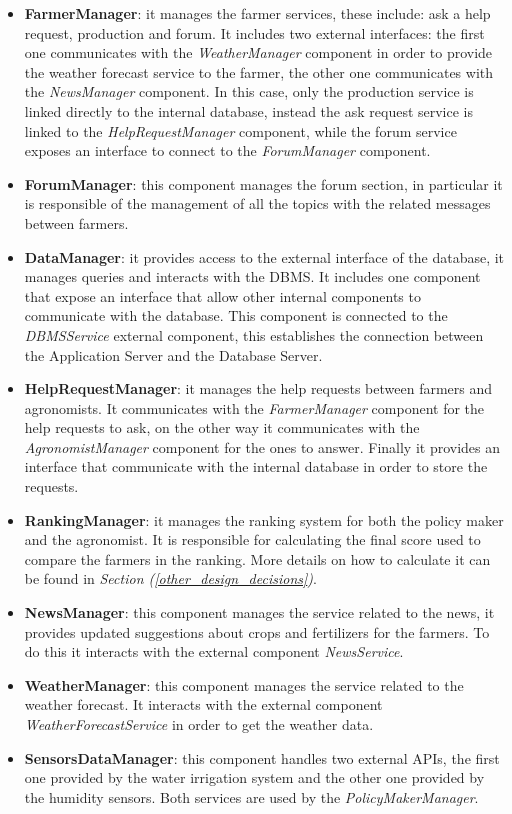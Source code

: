 \documentclass[table, 12pt]{article}
\begin{document}
\begin{itemize}
    \item \textbf{FarmerManager}: it manages the farmer services, these include: ask a help request, production and forum.
    It includes two external interfaces: the first one communicates with the \textit{WeatherManager} component in order to provide the weather forecast service to the farmer, the other one communicates with the \textit{NewsManager} component.
    In this case, only the production service is linked directly to the internal database, instead the ask request service is linked to the \textit{HelpRequestManager} component, while the forum service exposes an interface to connect to the \textit{ForumManager} component.
    \item \textbf{ForumManager}: this component manages the forum section, in particular it is responsible of the management of all the topics with the related messages between farmers.
    \item \textbf{DataManager}: it provides access to the external interface of the database, it manages queries and interacts with the DBMS.
    It includes one component that expose an interface that allow other internal components to communicate with the database.
    This component is connected to the \textit{DBMSService} external component, this establishes the connection between the Application Server and the Database Server.
    \item \textbf{HelpRequestManager}: it manages the help requests between farmers and agronomists.
    It communicates with the \textit{FarmerManager} component for the help requests to ask, on the other way it communicates with the \textit{AgronomistManager} component for the ones to answer.
    Finally it provides an interface that communicate with the internal database in order to store the requests.
    \item \textbf{RankingManager}: it manages the ranking system for both the policy maker and the agronomist.
    It is responsible for calculating the final score used to compare the farmers in the ranking.
    More details on how to calculate it can be found in \textit{Section (\ref{other_design_decisions})}.
    \item \textbf{NewsManager}: this component manages the service related to the news, it provides updated suggestions about crops and fertilizers for the farmers.
    To do this it interacts with the external component \textit{NewsService}.
    \item \textbf{WeatherManager}: this component manages the service related to the weather forecast.
    It interacts with the external component \textit{WeatherForecastService} in order to get the weather data.
    \item \textbf{SensorsDataManager}: this component handles two external APIs, the first one provided by the water irrigation system and the other one provided by the humidity sensors.
    Both services are used by the \textit{PolicyMakerManager}.
\end{itemize}
\end{document}
